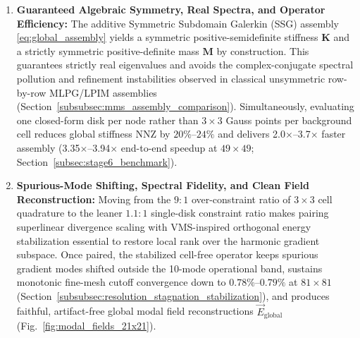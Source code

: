 \documentclass[VANCOUVER]{USG}
\begin{document}
\begin{enumerate}
    \item \textbf{Guaranteed Algebraic Symmetry, Real Spectra, and Operator Efficiency:} The additive Symmetric Subdomain Galerkin (SSG) assembly \eqref{eq:global_assembly} yields a symmetric positive-semidefinite stiffness $\mathbf{K}$ and a strictly symmetric positive-definite mass $\mathbf{M}$ by construction. This guarantees strictly real eigenvalues and avoids the complex-conjugate spectral pollution and refinement instabilities observed in classical unsymmetric row-by-row MLPG/LPIM assemblies (Section~\ref{subsubsec:mms_assembly_comparison}). Simultaneously, evaluating one closed-form disk per node rather than $3\times 3$ Gauss points per background cell reduces global stiffness NNZ by $20\%\text{--}24\%$ and delivers 2.0$\times$--3.7$\times$ faster assembly (3.35$\times$--3.94$\times$ end-to-end speedup at $49\times 49$; Section~\ref{subsec:stage6_benchmark}).
    \item \textbf{Spurious-Mode Shifting, Spectral Fidelity, and Clean Field Reconstruction:} Moving from the $9:1$ over-constraint ratio of $3\times 3$ cell quadrature to the leaner $1.1:1$ single-disk constraint ratio makes pairing superlinear divergence scaling with VMS-inspired orthogonal energy stabilization essential to restore local rank over the harmonic gradient subspace. Once paired, the stabilized cell-free operator keeps spurious gradient modes shifted outside the 10-mode operational band, sustains monotonic fine-mesh cutoff convergence down to $0.78\%\text{--}0.79\%$ at $81\times 81$ (Section~\ref{subsubsec:resolution_stagnation_stabilization}), and produces faithful, artifact-free global modal field reconstructions $\vec{E}_{\mathrm{global}}$ (Fig.~\ref{fig:modal_fields_21x21}).
\end{enumerate}
\end{document}
